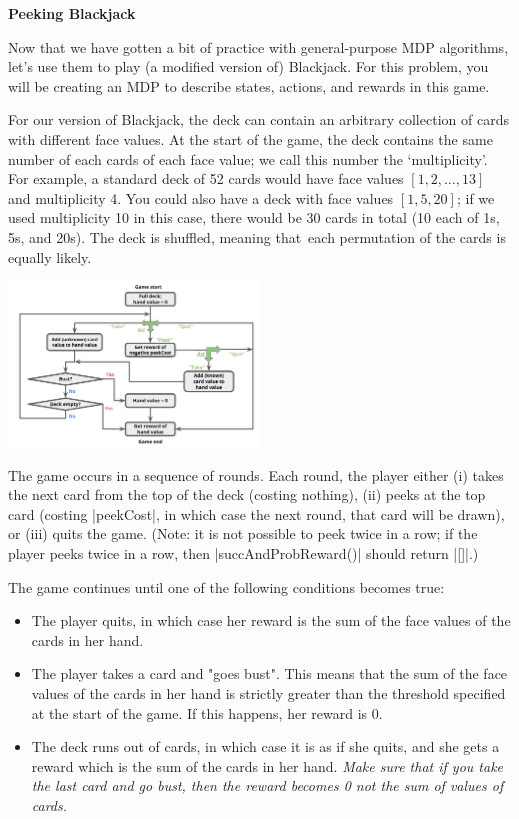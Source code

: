 \item {\bf Peeking Blackjack}

Now that we have gotten a bit of practice with general-purpose MDP algorithms,
let's use them to play (a modified version of) Blackjack. For this problem, you
will be creating an MDP to describe states, actions, and rewards in this game.

For our version of Blackjack, the deck can contain an arbitrary collection of
cards with different face values.  At the start of the game, the deck contains
the same number of each cards of each face value; we call this number the
`multiplicity'.  For example, a standard deck of 52 cards would have face values
$[1, 2, \ldots, 13]$ and multiplicity 4.  You could also have a deck with face
values $[1,5,20]$; if we used multiplicity 10 in this case, there would be 30
cards in total (10 each of 1s, 5s, and 20s). The deck is shuffled, meaning that\
each permutation of the cards is equally likely.

\begin{center}
\includegraphics[width=0.5\textwidth]{03-peeking-blackjack/blackjack_rule.png}
\end{center}

The game occurs in a sequence of rounds. Each round, the player either (i) takes
the next card from the top of the deck (costing nothing), (ii) peeks at the top
card (costing |peekCost|, in which case the next round, that card will be
drawn), or (iii) quits the game. (Note: it is not possible to peek twice in a
row; if the player peeks twice in a row, then |succAndProbReward()| should
return |[]|.)

The game continues until one of the following conditions becomes true:
\begin{itemize}
  \item The player quits, in which case her reward is the sum of the face values
  of the cards in her hand.
  \item The player takes a card and "goes bust".  This means that the sum of the
  face values of the cards in her hand is strictly greater than the threshold
  specified at the start of the game.  If this happens, her reward is 0.
  \item The deck runs out of cards, in which case it is as if she quits, and she
  gets a reward which is the sum of the cards in her hand. {\em Make sure that
  if you take the last card and go bust, then the reward becomes 0 not the sum
  of values of cards.}
\end{itemize}

